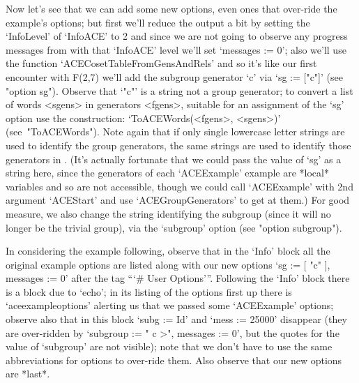 \endexample

Now let's see that we  can  add  some  new  options,  even  ones  that
over-ride the example's options; but first we'll reduce the  output  a
bit by setting the `InfoLevel' of `InfoACE' to 2 and since we are  not
going to observe any progress messages from {\ACE} with that `InfoACE'
level  we'll  set  `messages  :=  0';  also  we'll  use  the  function
`ACECosetTableFromGensAndRels' and so it's like  our  first  encounter
with F(2,7) we'll add the subgroup generator `c'  via  `sg  :=  ["c"]'
(see "option sg"). Observe that `"c"' is a string not a  {\GAP}  group
generator; to convert a list of {\GAP}  words  <sgens>  in  generators
<fgens>, suitable for  an  assignment  of  the  `sg'  option  use  the
construction: `ToACEWords(<fgens>, <sgens>)' (see~"ToACEWords").  Note
again that if  only  single  lowercase  letter  strings  are  used  to
identify the {\GAP} group generators, the same  strings  are  used  to
identify those generators in {\ACE}. (It's actually fortunate that  we
could pass the value of `sg' as a string here, since the generators of
each `ACEExample'  example  are  *local*  variables  and  so  are  not
accessible, though  we  could  call  `ACEExample'  with  2nd  argument
`ACEStart' and use `ACEGroupGenerators' to  get  at  them.)  For  good
measure, we also change the string identifying the subgroup (since  it
will no longer be the trivial group), via the `subgroup'  option  (see
"option subgroup").

In considering the example following, observe that in the `Info' block
all the original example options are listed along with our new options
`sg := [ "c" ], messages := 0' after the tag  ```\#  User  Options'''.
Following the `Info' block there is a block  due  to  `echo';  in  its
listing of the options first up there is `aceexampleoptions'  alerting
us that we passed some `ACEExample' options; observe also that in this
block `subg := Id' and `mess := 25000' disappear (they are over-ridden
by `subgroup := "\< c >", messages := 0', but the quotes for the value
of `subgroup' are not visible); note that we don't  have  to  use  the
same abbreviations for options to over-ride them.  Also  observe  that
our new options are *last*.

